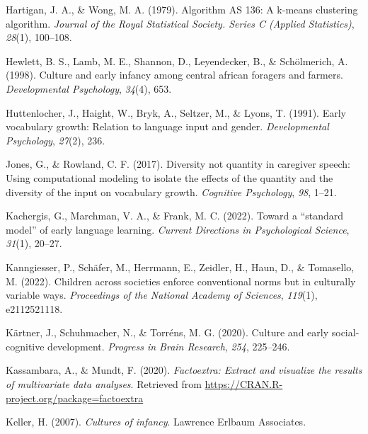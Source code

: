 \documentclass[
  man,floatsintext]{apa6}
\newlength{\cslhangindent}
\newlength{\cslentryspacingunit} %
\newenvironment{CSLReferences}[2] %
 {%
  \setlength{\parindent}{0pt}
  \ifodd #1
  \let\oldpar\par
  \def\par{\hangindent=\cslhangindent\oldpar}
  \fi
  \setlength{\parskip}{#2\cslentryspacingunit}
 }%
 {}
\begin{document}
\begin{CSLReferences}{1}{0}
\leavevmode{}%
Hartigan, J. A., \& Wong, M. A. (1979). Algorithm AS 136: A k-means clustering algorithm. \emph{Journal of the Royal Statistical Society. Series C (Applied Statistics)}, \emph{28}(1), 100--108.

\leavevmode{}%
Hewlett, B. S., Lamb, M. E., Shannon, D., Leyendecker, B., \& Schölmerich, A. (1998). Culture and early infancy among central african foragers and farmers. \emph{Developmental Psychology}, \emph{34}(4), 653.

\leavevmode{}%
Huttenlocher, J., Haight, W., Bryk, A., Seltzer, M., \& Lyons, T. (1991). Early vocabulary growth: Relation to language input and gender. \emph{Developmental Psychology}, \emph{27}(2), 236.

\leavevmode{}%
Jones, G., \& Rowland, C. F. (2017). Diversity not quantity in caregiver speech: Using computational modeling to isolate the effects of the quantity and the diversity of the input on vocabulary growth. \emph{Cognitive Psychology}, \emph{98}, 1--21.

\leavevmode{}%
Kachergis, G., Marchman, V. A., \& Frank, M. C. (2022). Toward a {``standard model''} of early language learning. \emph{Current Directions in Psychological Science}, \emph{31}(1), 20--27.

\leavevmode{}%
Kanngiesser, P., Schäfer, M., Herrmann, E., Zeidler, H., Haun, D., \& Tomasello, M. (2022). Children across societies enforce conventional norms but in culturally variable ways. \emph{Proceedings of the National Academy of Sciences}, \emph{119}(1), e2112521118.

\leavevmode{}%
Kärtner, J., Schuhmacher, N., \& Torréns, M. G. (2020). Culture and early social-cognitive development. \emph{Progress in Brain Research}, \emph{254}, 225--246.

\leavevmode{}%
Kassambara, A., \& Mundt, F. (2020). \emph{Factoextra: Extract and visualize the results of multivariate data analyses}. Retrieved from \url{https://CRAN.R-project.org/package=factoextra}

\leavevmode{}%
Keller, H. (2007). \emph{Cultures of infancy}. Lawrence Erlbaum Associates.


\end{CSLReferences}
\end{document}
